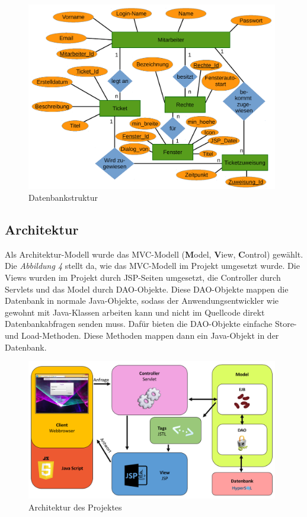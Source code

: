 \documentclass[12pt, a4paper]{article}
\begin{document}
\begin{figure}[H]
	\begin{center}
		\includegraphics[width=110mm]{Bilder/erd.pdf}
	\end{center}
	\caption{Datenbankstruktur}
\end{figure}

\subsection{Architektur}
Als Architektur-Modell wurde das MVC-Modell (\textbf{M}odel, \textbf{V}iew, \textbf{C}ontrol) gewählt. Die \textit{Abbildung 4} stellt da, wie das MVC-Modell im Projekt umgesetzt wurde. Die \glqq Views\grqq{} wurden im Projekt durch JSP-Seiten umgesetzt, die \glqq Controller\grqq{} durch Servlets und das \glqq Model\grqq{} durch DAO-Objekte. Diese DAO-Objekte mappen die Datenbank in normale Java-Objekte, sodass der Anwendungsentwickler wie gewohnt mit Java-Klassen arbeiten kann und nicht im Quellcode direkt Datenbankabfragen senden muss. Dafür bieten die DAO-Objekte einfache \glqq Store\grqq{}- und \glqq Load\grqq{}-Methoden. Diese Methoden mappen dann ein Java-Objekt in der Datenbank. 
\begin{figure}[H]
	\begin{center}
		\includegraphics[width=110mm]{Bilder/archDiagramm.png}
	\end{center}
	\caption{Architektur des Projektes}
\end{figure}
\end{document}
